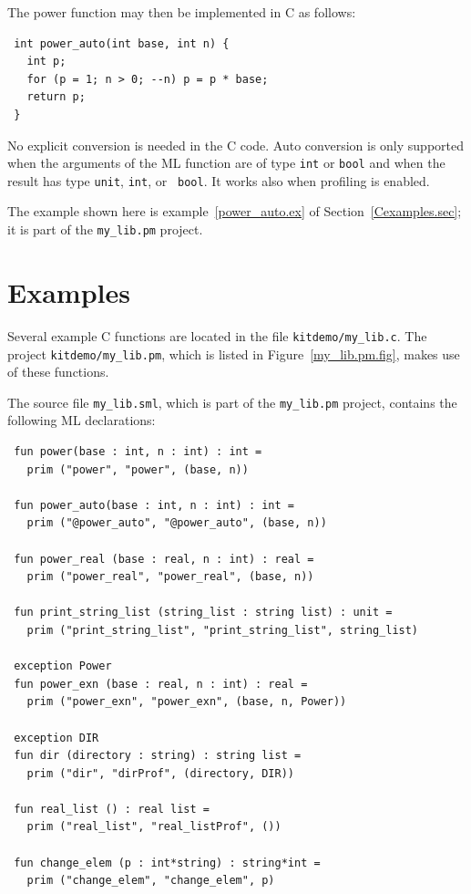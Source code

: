 \documentclass[12pt]{book}
\begin{document}
\noindent
The power function may then be implemented in C as follows:
\begin{verbatim}
 int power_auto(int base, int n) {
   int p;
   for (p = 1; n > 0; --n) p = p * base;
   return p;
 }
\end{verbatim}

\noindent
No explicit conversion is needed in the C code. Auto conversion is only
supported when the arguments of the ML function are of type {\tt int} or
{\tt bool} and when the result has type {\tt unit}, {\tt int}, or {\tt
  bool}. It works also when profiling is enabled.

The example shown here is example~\ref{power_auto.ex} of
Section~\ref{Cexamples.sec}; it is part of the \verb|my_lib.pm|
project.

\section{Examples\label{Cexamples.sec}}
%
%
%
Several example C functions are located in the file
\verb|kitdemo/my_lib.c|. The project \verb|kitdemo/my_lib.pm|, which
is listed in Figure~\ref{my_lib.pm.fig}, makes use of these functions.

The source file \verb|my_lib.sml|, which is part of the
\verb|my_lib.pm| project, contains the following ML declarations:
\begin{verbatim}
 fun power(base : int, n : int) : int = 
   prim ("power", "power", (base, n))

 fun power_auto(base : int, n : int) : int = 
   prim ("@power_auto", "@power_auto", (base, n))

 fun power_real (base : real, n : int) : real = 
   prim ("power_real", "power_real", (base, n))

 fun print_string_list (string_list : string list) : unit = 
   prim ("print_string_list", "print_string_list", string_list)

 exception Power
 fun power_exn (base : real, n : int) : real = 
   prim ("power_exn", "power_exn", (base, n, Power))

 exception DIR
 fun dir (directory : string) : string list = 
   prim ("dir", "dirProf", (directory, DIR))

 fun real_list () : real list = 
   prim ("real_list", "real_listProf", ())

 fun change_elem (p : int*string) : string*int =
   prim ("change_elem", "change_elem", p)
\end{verbatim}
\end{document}
